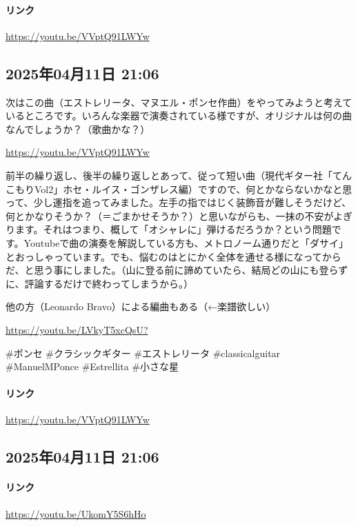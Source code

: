 \paragraph{リンク}
\url{https://youtu.be/VVptQ91LWYw}

\subsection*{2025年04月11日 21:06}

次はこの曲（エストレリータ、マヌエル・ポンセ作曲）をやってみようと考えているところです。いろんな楽器で演奏されている様ですが、オリジナルは何の曲なんでしょうか？（歌曲かな？）

\url{https://youtu.be/VVptQ91LWYw}

前半の繰り返し、後半の繰り返しとあって、従って短い曲（現代ギター社「てんこもりVol2」ホセ・ルイス・ゴンザレス編）ですので、何とかならないかなと思って、少し運指を追ってみました。左手の指ではじく装飾音が難しそうだけど、何とかなりそうか？（＝ごまかせそうか？）と思いながらも、一抹の不安がよぎります。それはつまり、概して「オシャレに」弾けるだろうか？という問題です。Youtubeで曲の演奏を解説している方も、メトロノーム通りだと「ダサイ」とおっしゃっています。でも、悩むのはとにかく全体を通せる様になってからだ、と思う事にしました。（山に登る前に諦めていたら、結局どの山にも登らずに、評論するだけで終わってしまうから。）

他の方（Leonardo Bravo）による編曲もある（←楽譜欲しい）

\url{https://youtu.be/LVkyT5xcQsU?}

\#ポンセ \#クラシックギター \#エストレリータ \#classicalguitar \#ManuelMPonce  \#Estrellita \#小さな星

\paragraph{リンク}
\url{https://youtu.be/VVptQ91LWYw}

\subsection*{2025年04月11日 21:06}

\paragraph{リンク}
\url{https://youtu.be/UkomY5S6hHo}

